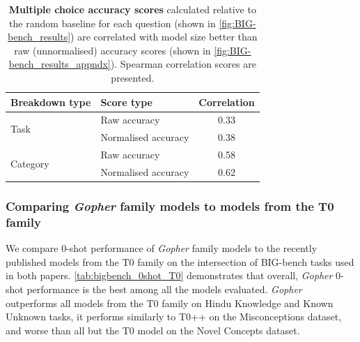 \documentclass[11pt, a4paper, logo, internal, copyright, nonumbering]{deepmind}
\newcommand{\gopher}{\textit{Gopher}\xspace}
\newcommand{\bigbench}{BIG-bench\xspace}
\begin{document}
\begin{table}[ht]
\footnotesize
    \centering
    \begin{tabular}{l|l|c}
Breakdown type & Score type & Correlation \\
\hline
\multirow{2}{*}{Task}       & Raw accuracy    &          0.33 \\
                            & Normalised accuracy &      0.38 \\
\multirow{2}{*}{Category}   & Raw accuracy    &          0.58 \\
                            & Normalised accuracy &      0.62 \\
    \end{tabular}
    \caption{\textbf{Multiple choice accuracy scores} calculated relative to the random baseline for each question (shown in \autoref{fig:BIG-bench_results}) are correlated with model size better than raw (unnormalised) accuracy scores (shown in \autoref{fig:BIG-bench_results_appndx}). Spearman correlation scores are presented.}
    \label{tab:bigbench_score_correlations}
\end{table}

\subsubsection{Comparing \gopher family models to models from the T0 family}
We compare 0-shot performance of \gopher family models to the recently published models from the T0 family \cite{sanh2021multitask} on the intersection of \bigbench tasks used in both papers. \autoref{tab:bigbench_0shot_T0} demonstrates that overall, \gopher 0-shot performance is the best among all the models evaluated. \gopher outperforms all models from the T0 family on Hindu Knowledge and Known Unknown tasks, it performs similarly to T0++ on the Misconceptions dataset, and worse than all but the T0 model on the Novel Concepts dataset. 
\end{document}
